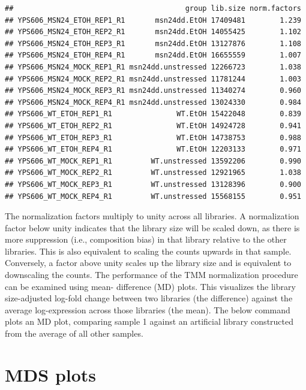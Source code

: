 \documentclass[
]{book}
\newenvironment{Shaded}{\begin{snugshade}}{\end{snugshade}}
\newcommand{\AttributeTok}[1]{\textcolor[rgb]{0.13,0.29,0.53}{#1}}
\newcommand{\ConstantTok}[1]{\textcolor[rgb]{0.56,0.35,0.01}{#1}}
\newcommand{\ControlFlowTok}[1]{\textcolor[rgb]{0.13,0.29,0.53}{\textbf{#1}}}
\newcommand{\DecValTok}[1]{\textcolor[rgb]{0.00,0.00,0.81}{#1}}
\newcommand{\FunctionTok}[1]{\textcolor[rgb]{0.13,0.29,0.53}{\textbf{#1}}}
\newcommand{\NormalTok}[1]{#1}
\newcommand{\SpecialCharTok}[1]{\textcolor[rgb]{0.81,0.36,0.00}{\textbf{#1}}}
\newcommand{\StringTok}[1]{\textcolor[rgb]{0.31,0.60,0.02}{#1}}
\begin{document}
\begin{verbatim}
##                                        group lib.size norm.factors
## YPS606_MSN24_ETOH_REP1_R1       msn24dd.EtOH 17409481        1.239
## YPS606_MSN24_ETOH_REP2_R1       msn24dd.EtOH 14055425        1.102
## YPS606_MSN24_ETOH_REP3_R1       msn24dd.EtOH 13127876        1.108
## YPS606_MSN24_ETOH_REP4_R1       msn24dd.EtOH 16655559        1.007
## YPS606_MSN24_MOCK_REP1_R1 msn24dd.unstressed 12266723        1.038
## YPS606_MSN24_MOCK_REP2_R1 msn24dd.unstressed 11781244        1.003
## YPS606_MSN24_MOCK_REP3_R1 msn24dd.unstressed 11340274        0.960
## YPS606_MSN24_MOCK_REP4_R1 msn24dd.unstressed 13024330        0.984
## YPS606_WT_ETOH_REP1_R1               WT.EtOH 15422048        0.839
## YPS606_WT_ETOH_REP2_R1               WT.EtOH 14924728        0.941
## YPS606_WT_ETOH_REP3_R1               WT.EtOH 14738753        0.988
## YPS606_WT_ETOH_REP4_R1               WT.EtOH 12203133        0.971
## YPS606_WT_MOCK_REP1_R1         WT.unstressed 13592206        0.990
## YPS606_WT_MOCK_REP2_R1         WT.unstressed 12921965        1.038
## YPS606_WT_MOCK_REP3_R1         WT.unstressed 13128396        0.900
## YPS606_WT_MOCK_REP4_R1         WT.unstressed 15568155        0.951
\end{verbatim}

The normalization factors multiply to unity across all libraries. A
normalization factor below unity indicates that the library size will be
scaled down, as there is more suppression (i.e., composition bias) in
that library relative to the other libraries. This is also equivalent to
scaling the counts upwards in that sample. Conversely, a factor above
unity scales up the library size and is equivalent to downscaling the
counts. The performance of the TMM normalization procedure can be
examined using mean- difference (MD) plots. This visualizes the library
size-adjusted log-fold change between two libraries (the difference)
against the average log-expression across those libraries (the mean).
The below command plots an MD plot, comparing sample 1 against an
artificial library constructed from the average of all other samples.

\hypertarget{mds-plots}{%
\section{MDS plots}\label{mds-plots}}

\begin{Shaded}
\end{Shaded}
\end{document}
